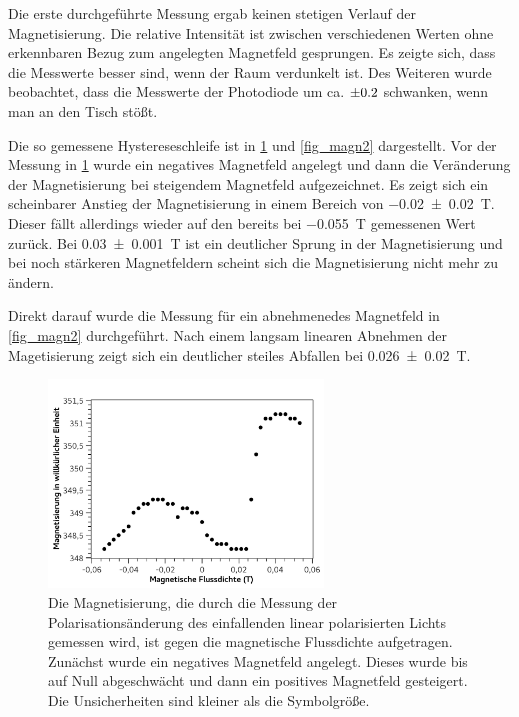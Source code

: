 \documentclass[
	a4paper,
	12pt,
	pagesize,
	ngerman
]{scrartcl}
\begin{document}
	Die erste durchgeführte Messung ergab keinen stetigen Verlauf der Magnetisierung.
	Die relative Intensität ist zwischen verschiedenen Werten ohne erkennbaren Bezug zum angelegten Magnetfeld gesprungen.
	Es zeigte sich, dass die Messwerte besser sind, wenn der Raum verdunkelt ist.
	Des Weiteren wurde beobachtet, dass die Messwerte der Photodiode um ca. $\SI{\pm0,2}{}$ schwanken, wenn man an den Tisch stößt. %

	Die so gemessene Hystereseschleife ist in \cref{fig_magn1} und \cref{fig_magn2} dargestellt.
	Vor der Messung in \cref{fig_magn1} wurde ein negatives Magnetfeld angelegt und dann die Veränderung der Magnetisierung bei steigendem Magnetfeld aufgezeichnet.
	Es zeigt sich ein scheinbarer Anstieg der Magnetisierung in einem Bereich von \SI{-0,02+-0,02}{T}. 
	Dieser fällt allerdings wieder auf den bereits bei \SI{-0,055}{T} gemessenen Wert zurück.
	Bei \SI{0,03+-0,001}{T} ist ein deutlicher Sprung in der Magnetisierung und bei noch stärkeren Magnetfeldern scheint sich die Magnetisierung nicht mehr zu ändern.

	Direkt darauf wurde die Messung für ein abnehmenedes Magnetfeld in \cref{fig_magn2} durchgeführt.
	Nach einem langsam linearen Abnehmen der Magetisierung zeigt sich ein deutlicher steiles Abfallen bei \SI{0,026+-0,02}{T}.
	

	
	\begin{figure}[H]  %
		\includegraphics[width=0.65\textwidth]{fig_magn1} %
		\centering
		\caption{Die Magnetisierung, die durch die Messung der Polarisationsänderung des einfallenden linear polarisierten Lichts gemessen wird, ist gegen die magnetische Flussdichte aufgetragen. Zunächst wurde ein negatives Magnetfeld angelegt. Dieses wurde bis auf Null abgeschwächt und dann ein positives Magnetfeld gesteigert. Die Unsicherheiten sind kleiner als die Symbolgröße.} %
		\label{fig_magn1}
		\centering
	\end{figure}
\end{document}
